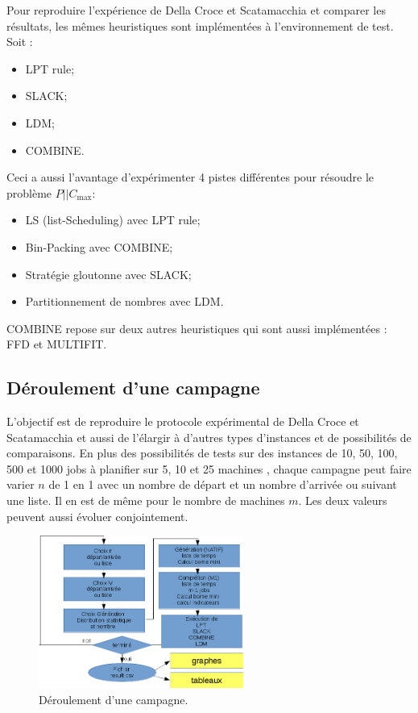 \documentclass[a4paper,12pt]{report}
\theoremstyle{plain}				%
\theoremstyle{definition}				%
\newcommand\problemGrahamP{$P||C_{\max}$\xspace}
\newcommand\dcs{Della Croce et Scatamacchia\xspace}
\begin{document}
Pour reproduire l'expérience de \dcs et comparer les résultats, les mêmes heuristiques sont implémentées à l'environnement de test. Soit :
\begin{itemize}
	\item LPT rule;
	\item SLACK;
	\item LDM;
	\item COMBINE.
\end{itemize}

Ceci a aussi l'avantage d'expérimenter 4 pistes différentes pour résoudre le problème \problemGrahamP :
\begin{itemize}
	\item LS (list-Scheduling) avec LPT rule; 
	\item Bin-Packing avec COMBINE; 
	\item Stratégie gloutonne avec SLACK; 
	\item Partitionnement de nombres avec LDM.  
\end{itemize}

COMBINE repose sur deux autres heuristiques qui sont aussi implémentées : FFD et MULTIFIT.



\subsection{Déroulement d'une campagne} \label{ssec:campagnesDeroullementDUneCampagne}
L'objectif est de reproduire le protocole expérimental de \dcs et aussi de l'élargir 
  à d'autres types d'instances et de possibilités de comparaisons.
En plus des possibilités de tests sur des instances de 10, 50, 100, 500 et 1000 jobs à planifier 
  sur 5, 10 et 25 machines \cite{della2020longest}, 
  chaque campagne peut faire varier $n$ de 1 en 1 avec 
  un nombre de départ et un nombre d'arrivée 
  ou suivant une liste. 
Il en est de même pour le nombre de machines $m$. 
Les deux valeurs peuvent aussi évoluer conjointement.

\begin{figure}
{\centering
\includegraphics[height=50mm]{derouleCampagne.png}
\caption{Déroulement d'une campagne.}
\label{fig:deroulementDUneCampagne}
\par}
\end{figure}
\end{document}
